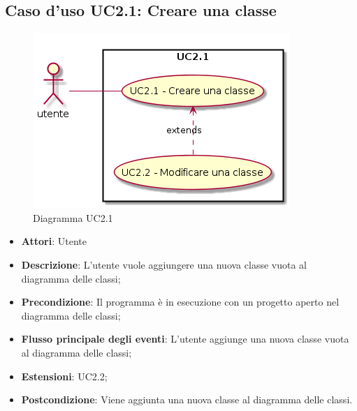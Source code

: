 \documentclass[../AnalisiDeiRequisiti.tex]{subfiles}
\begin{document}
	\subsection{Caso d'uso UC2.1: Creare una classe}
	\begin{figure} [H]
		\centering
		\includegraphics[scale=0.45]{./Figures/UC2_1.png}
		\caption{Diagramma UC2.1}\label{}
	\end{figure}
	\begin{itemize}
		\item \textbf{Attori}: Utente
		\item \textbf{Descrizione}: L'utente vuole aggiungere una nuova classe vuota al diagramma delle classi;
		\item \textbf{Precondizione}: Il programma è in esecuzione con un progetto aperto nel diagramma delle classi;
		\item \textbf{Flusso principale degli eventi}: L'utente aggiunge una nuova classe vuota al diagramma delle classi;
		\item \textbf{Estensioni}: UC2.2;
		\item \textbf{Postcondizione}: Viene aggiunta una nuova classe al diagramma delle classi.
	\end{itemize}
\end{document}
